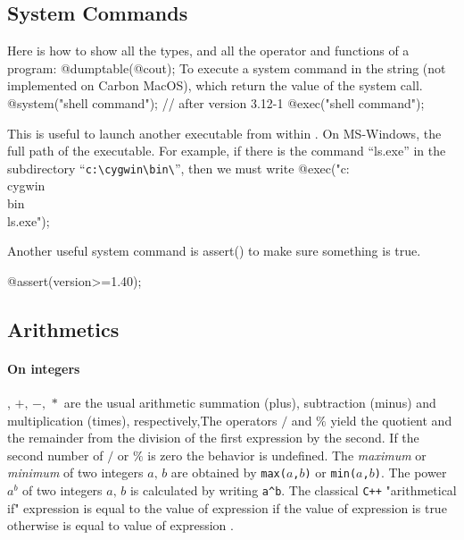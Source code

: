 \documentclass[a4paper,twoside,12pt]{book}
\def\key#1{\emph{#1}\index{#1}}
\def\x#1{#1\index{#1}}%
\begin{document}
\subsection{System Commands}

Here is how to show all the types, and all the operator and functions of a \freefempp program:
\bFF
 @dumptable(@cout);
\eFF {}
To execute a system command in the string (not implemented on Carbon MacOS), which  return 
the value of the system call. 
\bFF
  @system("shell command"); // after version 3.12-1
  @exec("shell command");  
  
\eFF
This is useful to launch another executable from within \freefempp.
On MS-Windows, the full path of the executable. For example, if there is the command
``ls.exe'' in the subdirectory ``\verb|c:\cygwin\bin\|'', then we must write
\bFF
  @exec("c:\\cygwin\\bin\\ls.exe");
\eFF
{}

Another useful system command is \x{assert()} to make sure something is true.

\bFF
@assert(version>=1.40);
\eFF


\subsection{Arithmetics}
\paragraph{On integers}, $+,\, -,\, *$ are the usual arithmetic summation (plus),
subtraction (minus) and multiplication (times), respectively,The operators $/$ and $\%$ yield the quotient and the remainder from the division of the first expression by the second.
If the second number of $/$ or $\%$ is zero the behavior is undefined.
The \key{maximum} or \key{minimum} of two integers $a,\, b$ are obtained
by \texttt{max($a$,$b$)} or
\texttt{min($a$,$b$)}.
The power $a^b$ of two integers $a,\, b$ is calculated by writing \verb|a^b|.
The classical \texttt{C++}
"arithmetical if"  expression  is equal to  the value of expression  if
the value of expression   is true otherwise is equal to value of expression .
\end{document}
